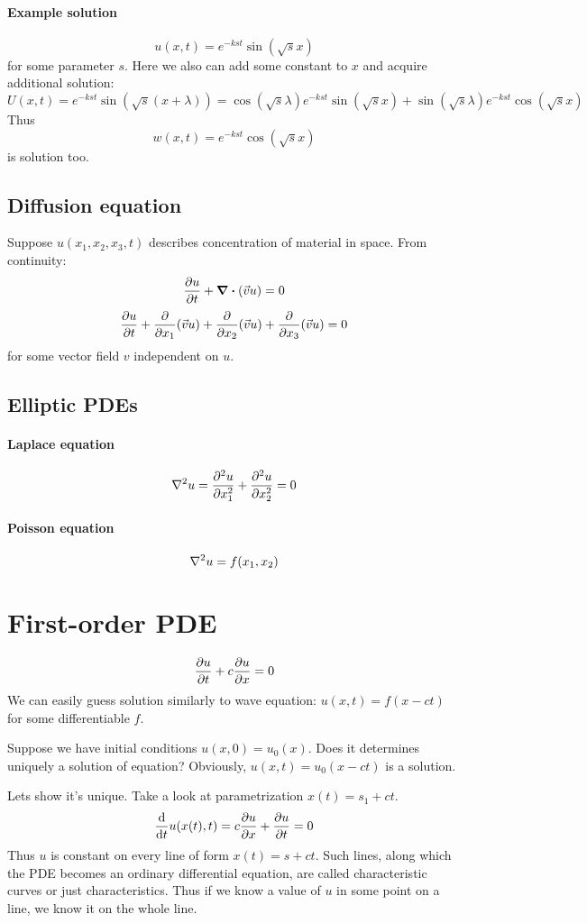 \paragraph{Example solution}
$$u(x,t) = e^{-kst} \sin (\sqrt{s} x)$$
for some parameter $s$. Here we also can add some constant to $x$ and acquire additional solution:
$$U(x,t) = e^{-kst} \sin (\sqrt{s} (x+\lambda)) = \cos (\sqrt{s} \lambda ) e^{-kst} \sin (\sqrt{s} x) +  \sin (\sqrt{s} \lambda ) e^{-kst} \cos (\sqrt{s} x)$$
Thus
$$w(x,t) =  e^{-kst} \cos (\sqrt{s} x)$$
is solution too.
\subsection{Diffusion equation}
Suppose
$u(x_1,x_2,x_3,t)$ describes concentration of material in space. From continuity:
$$\pdv{u}{t} + \div(\vec{v} u) = 0$$
$$\pdv{u}{t} +\pdv{ x_1} (\vec{v} u) +\pdv{ x_2} (\vec{v} u) +\pdv{ x_3} (\vec{v} u) = 0$$
for some vector field $v$ independent on $u$.
\subsection{Elliptic PDEs}
\paragraph{Laplace equation}
$$\laplacian{u}  = \pdv[2]{u}{x_1} + \pdv[2]{u}{x_2} = 0$$
\paragraph{Poisson equation}
$$\laplacian{u}  = f(x_1,x_2)$$
\section{First-order PDE}
$$\pdv{u}{t} + c\pdv{u}{x} = 0$$
We can easily guess solution similarly to wave equation: $u(x,t) = f(x-ct)$ for some differentiable $f$. 

Suppose we have initial conditions $u(x,0)= u_0(x)$. Does it determines uniquely a solution of equation? Obviously, $u(x,t) = u_0(x-ct)$ is a solution.

Lets show it's unique. Take a look at parametrization $x(t) = s_1 + ct$.
$$\dv{t} u(x(t),t) = c\pdv{u}{x}(x(t),t) + \pdv{u}{t}(x(t),t) = 0$$ 
Thus $u$ is constant on every line of form $x(t)=s+ct$. Such lines, along which the PDE becomes an ordinary differential equation, are called characteristic curves or just characteristics. Thus if we know a value of $u$ in some point on a line, we know it on the whole line.

